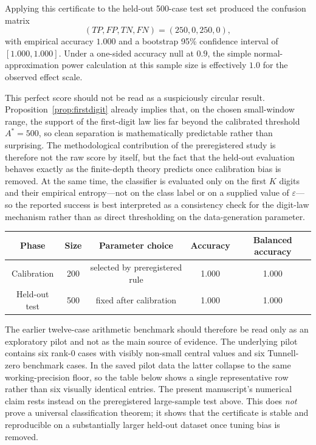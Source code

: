 \documentclass[11pt]{article}
\begin{document}
Applying this certificate to the held-out 500-case test set produced the confusion matrix
\[
(TP,FP,TN,FN)=(250,0,250,0),
\]
with empirical accuracy $1.000$ and a bootstrap 95\% confidence interval of $[1.000,1.000]$. Under a one-sided accuracy null at $0.9$, the simple normal-approximation power calculation at this sample size is effectively $1.0$ for the observed effect scale.

This perfect score should not be read as a suspiciously circular result. Proposition~\ref{prop:firstdigit} already implies that, on the chosen small-window range, the support of the first-digit law lies far beyond the calibrated threshold $A^*=500$, so clean separation is mathematically predictable rather than surprising. The methodological contribution of the preregistered study is therefore not the raw score by itself, but the fact that the held-out evaluation behaves exactly as the finite-depth theory predicts once calibration bias is removed. At the same time, the classifier is evaluated only on the first $K$ digits and their empirical entropy---not on the class label or on a supplied value of $\varepsilon$---so the reported success is best interpreted as a consistency check for the digit-law mechanism rather than as direct thresholding on the data-generation parameter.

\begin{center}
\begin{tabular}{ccccc}
\toprule
Phase & Size & Parameter choice & Accuracy & Balanced accuracy \\
\midrule
Calibration & 200 & selected by preregistered rule & 1.000 & 1.000 \\
Held-out test & 500 & fixed after calibration & 1.000 & 1.000 \\
\bottomrule
\end{tabular}
\end{center}

The earlier twelve-case arithmetic benchmark should therefore be read only as an exploratory pilot and not as the main source of evidence. The underlying pilot contains six rank-0 cases with visibly non-small central values and six Tunnell-zero benchmark cases. In the saved pilot data the latter collapse to the same working-precision floor, so the table below shows a single representative row rather than six visually identical entries. The present manuscript's numerical claim rests instead on the preregistered large-sample test above. This does \emph{not} prove a universal classification theorem; it shows that the certificate is stable and reproducible on a substantially larger held-out dataset once tuning bias is removed.
\end{document}
